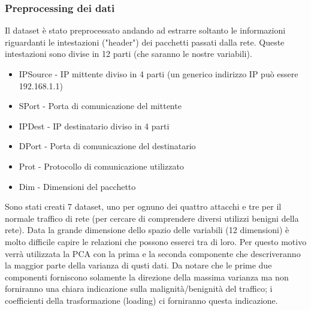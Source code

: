 \documentclass[12pt]{article}
\begin{document}
		\subsubsection{Preprocessing dei dati}
			Il dataset è stato preprocessato andando ad estrarre soltanto le informazioni riguardanti le intestazioni ("header") dei pacchetti passati dalla rete.
			Queste intestazioni sono divise in 12 parti (che saranno le nostre variabili).
			\begin{itemize}
				\item IPSource - IP mittente diviso in 4 parti (un generico indirizzo IP può essere 192.168.1.1)
				\item SPort - Porta di comunicazione del mittente
				\item IPDest - IP destinatario diviso in 4 parti
				\item DPort - Porta di comunicazione del destinatario
				\item Prot - Protocollo di comunicazione utilizzato
				\item Dim - Dimensioni del pacchetto
			\end{itemize}
			Sono stati creati 7 dataset, uno per ognuno dei quattro attacchi e tre per il normale traffico di rete (per cercare di comprendere diversi utilizzi benigni della rete). Data la grande dimensione dello spazio delle variabili (12 dimensioni) è molto difficile capire le relazioni che possono esserci tra di loro. Per questo motivo verrà utilizzata la \ac{PCA} con la prima e la seconda componente che descriveranno la maggior parte della varianza di qusti dati. Da notare che le prime due componenti forniscono solamente la direzione della massima varianza ma non forniranno una chiara indicazione sulla malignità/benignità del traffico; i coefficienti della trasformazione (loading) ci forniranno questa indicazione.
			
\end{document}
